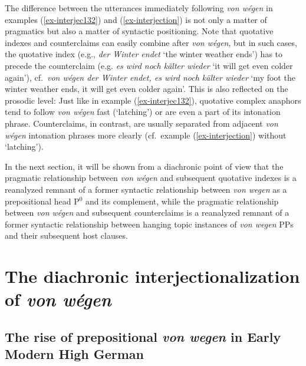 \documentclass[output=paper
  ,nobabel
  ,draftmode
  ,babelshorthands
  ,colorlinks, citecolor=brown
]{langscibook}
\begin{document}
\noindent
The difference between the utterances immediately following \emph{von wégen} in examples (\ref{ex-interjec132}) and (\ref{ex-interjection}) is not only a matter of pragmatics but also a matter of syntactic positioning. Note that quotative indexes and counterclaims can easily combine after \emph{von wégen}, but in such cases, the quotative index (e.g., \emph{der Winter endet} `the winter weather ends') has to precede the counterclaim (e.g. \emph{es wird noch kälter wieder} `it will get even colder again'), cf.\ \emph{von wégen der Winter endet, es wird noch kälter wieder} `my foot the winter weather ends, it will get even colder again'. This is also reflected on the prosodic level: Just like in example (\ref{ex-interjec132}), quotative complex anaphors tend to follow \emph{von wégen} fast (`latching') or are even a part of its intonation phrase. Counterclaims, in contrast, are usually separated from adjacent \emph{von wégen} intonation phrases more clearly (cf.\ example (\ref{ex-interjection}) without `latching').

In the next section, it will be shown from a diachronic point of view that the pragmatic relationship between \emph{von wégen} and subsequent quotative indexes is a reanalyzed remnant of a former syntactic relationship between \emph{von wegen} as a prepositional head P$^0$ and its complement, while the pragmatic relationship between \emph{von wégen} and subsequent counterclaims is a reanalyzed remnant of a former syntactic relationship between hanging topic instances of \emph{von wegen} PPs and their subsequent host clauses.

\section{The diachronic interjectionalization of \emph{von wégen}}\label{sec-past-vw}
\subsection{The rise of prepositional \emph{von wegen} in Early Modern High German}\label{ssec-frnhd-vw}
\end{document}
